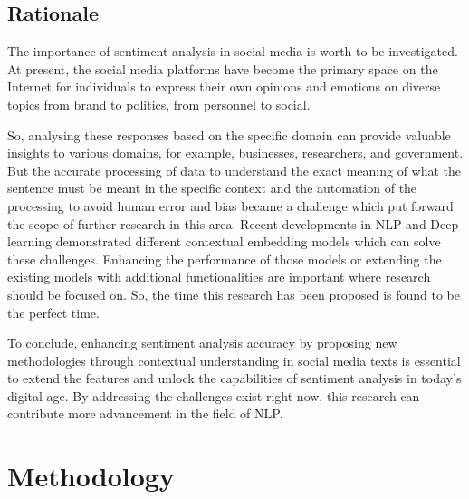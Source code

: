 \documentclass[a4paper,onecolumn,11pt]{article}
\begin{document}
\subsection{Rationale}

The importance of sentiment analysis in social media is worth to be investigated. At present, the social media platforms have become the primary space on the Internet for individuals to express their own opinions and emotions on diverse topics from brand to politics, from personnel to social. 

So, analysing these responses based on the specific domain can provide valuable insights to various domains, for example, businesses, researchers, and government. But the accurate processing of data to understand the exact meaning of what the sentence must be meant in the specific context and the automation of the processing to avoid human error and bias became a challenge which put forward the scope of further research in this area. Recent developments in NLP and Deep learning demonstrated different contextual embedding models which can solve these challenges. Enhancing the performance of those models or extending the existing models with additional functionalities are important where research should be focused on. So, the time this research has been proposed is found to be the perfect time. 

To conclude, enhancing sentiment analysis accuracy by proposing new methodologies through contextual understanding in social media texts is essential to extend the features and unlock the capabilities of sentiment analysis in today’s digital age. By addressing the challenges exist right now, this research can contribute more advancement in the field of NLP. 


\section{Methodology}
\end{document}
